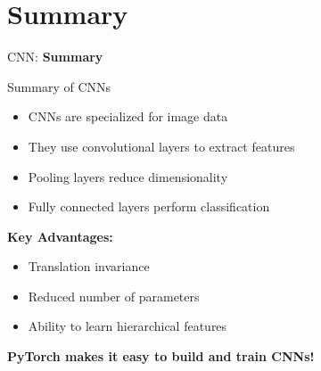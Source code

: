 \section{Summary}
\begin{frame}{}
    \LARGE CNN: \textbf{Summary}
\end{frame}

\begin{frame}{Summary of CNNs}
    \begin{itemize}
        \item CNNs are specialized for image data
        \item They use convolutional layers to extract features
        \item Pooling layers reduce dimensionality
        \item Fully connected layers perform classification
    \end{itemize}
    \vspace{1em}
    \textbf{Key Advantages:}
    \begin{itemize}
        \item Translation invariance
        \item Reduced number of parameters
        \item Ability to learn hierarchical features
    \end{itemize}
    \vspace{1em}
    \textbf{PyTorch makes it easy to build and train CNNs!}
\end{frame}